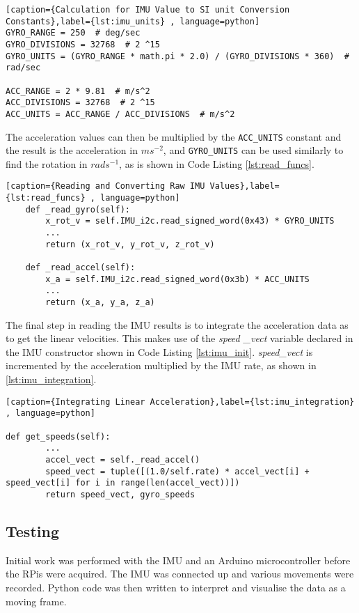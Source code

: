 \begin{lstlisting}[caption={Calculation for IMU Value to SI unit Conversion Constants},label={lst:imu_units} , language=python]
GYRO_RANGE = 250  # deg/sec
GYRO_DIVISIONS = 32768  # 2 ^15
GYRO_UNITS = (GYRO_RANGE * math.pi * 2.0) / (GYRO_DIVISIONS * 360)  # rad/sec

ACC_RANGE = 2 * 9.81  # m/s^2
ACC_DIVISIONS = 32768  # 2 ^15
ACC_UNITS = ACC_RANGE / ACC_DIVISIONS  # m/s^2
\end{lstlisting}

The acceleration values can then be multiplied by the \verb|ACC_UNITS|
constant and the result is the acceleration in $ms^{-2}$, and \verb|GYRO_UNITS|
can be used similarly to find the rotation in $rads^{-1}$, as is
shown in Code Listing \ref{lst:read_funcs}.


\begin{lstlisting}[caption={Reading and Converting Raw IMU Values},label={lst:read_funcs} , language=python]
    def _read_gyro(self):
        x_rot_v = self.IMU_i2c.read_signed_word(0x43) * GYRO_UNITS
		...
        return (x_rot_v, y_rot_v, z_rot_v)

    def _read_accel(self):
        x_a = self.IMU_i2c.read_signed_word(0x3b) * ACC_UNITS
		...
        return (x_a, y_a, z_a)
\end{lstlisting}

The final step in reading the IMU results is to integrate the acceleration
data as to get the linear velocities. This makes use of the \textit{speed
\_vect} variable declared in the IMU constructor shown in Code Listing
\ref{lst:imu_init}. \textit{speed\_vect} is incremented by the
acceleration multiplied by the IMU rate, as shown in
\ref{lst:imu_integration}.

\begin{lstlisting}[caption={Integrating Linear Acceleration},label={lst:imu_integration} , language=python]

def get_speeds(self):
		...
        accel_vect = self._read_accel()
        speed_vect = tuple([(1.0/self.rate) * accel_vect[i] + speed_vect[i] for i in range(len(accel_vect))])
        return speed_vect, gyro_speeds
\end{lstlisting}


\subsection{Testing}\label{elec/imu/test}
Initial work was performed with the IMU and an Arduino microcontroller
before the RPis were acquired. The IMU was connected up and various
movements were recorded. Python code was then written to interpret and
visualise the data as a moving frame.

